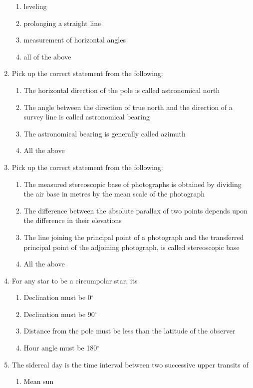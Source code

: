 \documentclass[11pt,a4paper]{article}
\begin{document}
\begin{enumerate}
\begin{enumerate}[label=\Alph*.]
\item{leveling}
\item{prolonging a straight line}
\item{measurement of horizontal angles}
\item{all of the above}
\end{enumerate}
\item{Pick up the correct statement from the following:}
\begin{enumerate}[label=\Alph*.]
\item{The horizontal direction of the pole is called astronomical north}
\item{The angle between the direction of true north and the direction of a survey line is called astronomical bearing}
\item{The astronomical bearing is generally called azimuth}
\item{All the above}
\end{enumerate}
\item{Pick up the correct statement from the following:}
\begin{enumerate}[label=\Alph*.]
\item{The measured stereoscopic base of photographs is obtained by dividing the air base in metres by the mean scale of the photograph}
\item{The difference between the absolute parallax of two points depends upon the difference in their elevations}
\item{The line joining the principal point of a photograph and the transferred principal point of the adjoining photograph, is called stereoscopic base}
\item{All the above}
\end{enumerate}
\item{For any star to be a circumpolar star, its}
\begin{enumerate}[label=\Alph*.]
\item{Declination must be 0$^\circ$}
\item{Declination must be 90$^\circ$}
\item{Distance from the pole must be less than the latitude of the observer}
\item{Hour angle must be 180$^\circ$}
\end{enumerate}
\item{The sidereal day is the time interval between two successive upper transits of}
\begin{enumerate}[label=\Alph*.]
\item{Mean sun}

\end{enumerate}
\end{enumerate}
\end{document}
